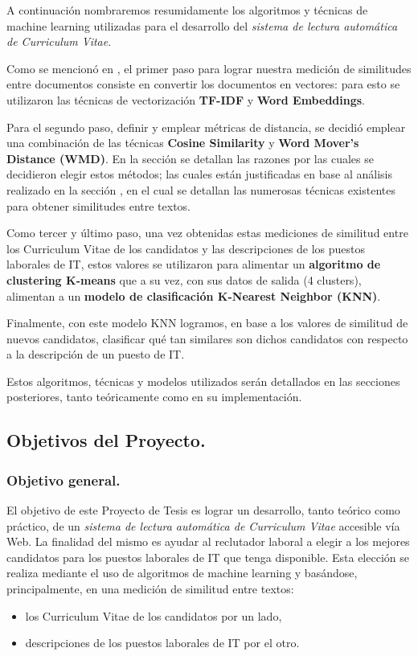 \documentclass[12pt,a4paper]{article}
\begin{document}
\begin{sloppypar}
A continuación nombraremos resumidamente los algoritmos y técnicas de machine learning utilizadas para el desarrollo del \textit{sistema de lectura automática de Curriculum Vitae}. 

Como se mencionó en \textit{}, el primer paso para lograr nuestra medición de similitudes entre documentos consiste en convertir los documentos en vectores: para esto se utilizaron las técnicas de vectorización \textbf{TF-IDF} y \textbf{Word Embeddings}.

Para el segundo paso, definir y emplear métricas de distancia, se decidió emplear una combinación de las técnicas \textbf{Cosine Similarity} y \textbf{Word Mover’s Distance (WMD)}. En la sección \textit{} se detallan las razones por las cuales se decidieron elegir estos métodos; las cuales están justificadas en base al análisis realizado en la sección \textit{}, en el cual se detallan las numerosas técnicas existentes para obtener similitudes entre textos.

Como tercer y último paso, una vez obtenidas estas mediciones de similitud entre los Curriculum Vitae de los candidatos y las descripciones de los puestos laborales de IT, estos valores se utilizaron para alimentar un \textbf{algoritmo de clustering K-means} que a su vez, con sus datos de salida (4 clusters), alimentan a un \textbf{modelo de clasificación K-Nearest Neighbor (KNN)}.

Finalmente, con este modelo KNN logramos, en base a los valores de similitud de nuevos candidatos, clasificar qué tan similares son dichos candidatos con respecto a la descripción de un puesto de IT.

Estos algoritmos, técnicas y modelos utilizados serán detallados en las secciones posteriores, tanto teóricamente como en su implementación. 

\cleardoublepage    %

\subsection{Objetivos del Proyecto.}

\subsubsection{Objetivo general.}

El objetivo de este Proyecto de Tesis es lograr un desarrollo, tanto teórico como práctico, de un \textit{sistema de lectura automática de Curriculum Vitae} accesible vía Web. La finalidad del mismo es ayudar al reclutador laboral a elegir a los mejores candidatos para los puestos laborales de IT que tenga disponible. Esta elección se realiza mediante el uso de algoritmos de machine learning y basándose, principalmente, en una medición de similitud entre textos:  
\begin{itemize}
\item los Curriculum Vitae de los candidatos por un lado, 
\item descripciones de los puestos laborales de IT por el otro.
\end{itemize} 


\end{sloppypar}
\end{document}
